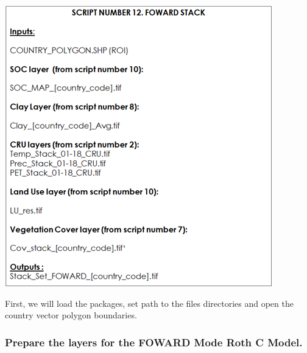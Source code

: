 \documentclass[
  10pt,
  b5paper,
]{book}
\begin{document}
\includegraphics{tables/Table_9.11.png}

First, we will load the packages, set path to the files directories and open the country vector polygon boundaries.

\hypertarget{prepare-the-layers-for-the-foward-mode-roth-c-model.}{%
\subsubsection{Prepare the layers for the FOWARD Mode Roth C Model.}\label{prepare-the-layers-for-the-foward-mode-roth-c-model.}}
\end{document}
